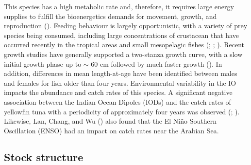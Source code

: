 \documentclass[
]{scrartcl}
\begin{document}
This species has a high metabolic rate and, therefore, it requires large
energy supplies to fulfill the bioenergetics demands for movement,
growth, and reproduction
(). Feeding behaviour is largely opportunistic, with a variety
of prey species being consumed, including large concentrations of
crustacean that have occurred recently in the tropical areas and small
mesopelagic fishes
(; ; ).
Recent growth studies have generally supported a two-stanza growth
curve, with a slow initial growth phase up to \(\sim\) 60 cm followed by
much faster growth
(). In
addition, differences in mean length-at-age have been identified between
males and females for fish older than four years. Environmental
variability in the IO impacts the abundance and catch rates of this
species. A significant negative association between the Indian Ocean
Dipoles (IODs) and the catch rates of yellowfin tuna with a periodicity
of approximately four years was observed
(; ). Likewise, Lan, Chang, and Wu
() also found
that the El Niño Southern Oscillation (ENSO) had an impact on catch
rates near the Arabian Sea.

\subsection{Stock structure}\label{stock-structure}
\end{document}
